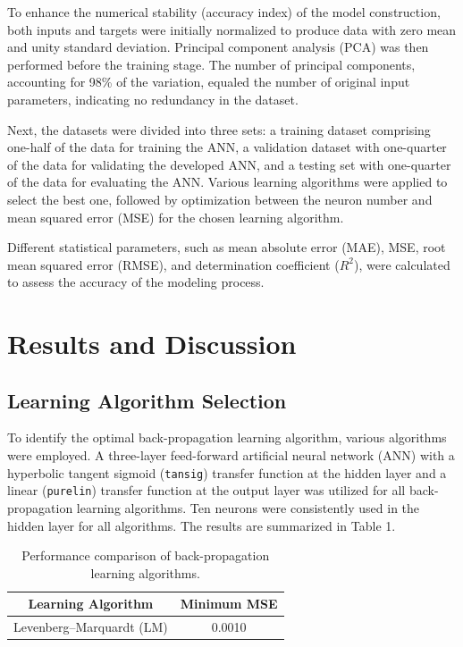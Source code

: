 \documentclass{article}
\begin{document}
To enhance the numerical stability (accuracy index) of the model construction, both inputs and targets were initially normalized to produce data with zero mean and unity standard deviation. Principal component analysis (PCA) was then performed before the training stage. The number of principal components, accounting for 98\% of the variation, equaled the number of original input parameters, indicating no redundancy in the dataset.

Next, the datasets were divided into three sets: a training dataset comprising one-half of the data for training the ANN, a validation dataset with one-quarter of the data for validating the developed ANN, and a testing set with one-quarter of the data for evaluating the ANN. Various learning algorithms were applied to select the best one, followed by optimization between the neuron number and mean squared error (MSE) for the chosen learning algorithm.

Different statistical parameters, such as mean absolute error (MAE), MSE, root mean squared error (RMSE), and determination coefficient ($R^2$), were calculated to assess the accuracy of the modeling process.



\section{Results and Discussion}

\subsection{Learning Algorithm Selection}

To identify the optimal back-propagation learning algorithm, various algorithms were employed. A three-layer feed-forward artificial neural network (ANN) with a hyperbolic tangent sigmoid (\texttt{tansig}) transfer function at the hidden layer and a linear (\texttt{purelin}) transfer function at the output layer was utilized for all back-propagation learning algorithms. Ten neurons were consistently used in the hidden layer for all algorithms. The results are summarized in Table 1.

\begin{table}[ht]
	\centering
	\begin{tabular}{|c|c|}
		\hline
		\textbf{Learning Algorithm} & \textbf{Minimum MSE} \\ \hline
		Levenberg–Marquardt (LM)   & 0.0010              \\ \hline
	\end{tabular}
	\caption{Performance comparison of back-propagation learning algorithms.}
	\label{tab:learning_algorithms}
\end{table}
\end{document}
